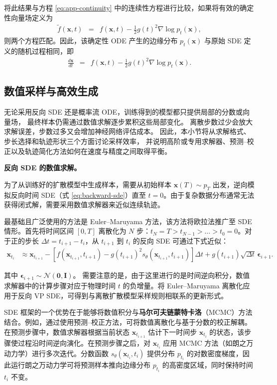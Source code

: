 \documentclass[UTF8,a4paper,zihao=-4,oneside,openany]{ctexbook}
\begin{document}
将此结果与方程 \eqref{eq:app-continuity} 中的连续性方程进行比较，如果将有效的确定性向量场定义为
\begin{eqnarray}
\tilde{f}(\mathbf{x}, t) & = & f(\mathbf{x}, t) - \frac{1}{2} g(t)^2 \nabla \log p_t(\mathbf{x}),
\end{eqnarray}
则两个方程匹配。因此，该确定性 ODE 产生的边缘分布 $p_t(\mathbf{x})$ 与原始 SDE 定义的随机过程相同，即
\begin{eqnarray}
\frac{d\mathbf{x}}{dt} & = & f(\mathbf{x}, t) - \frac{1}{2} g(t)^2 \nabla \log p_t(\mathbf{x}).
\end{eqnarray}

\subsection{数值采样与高效生成}

无论采用反向 SDE 还是概率流 ODE，训练得到的模型都只提供局部的分数或向量场，
最终样本仍需通过数值求解逐步累积这些局部变化。
离散步数过少会放大求解误差，步数过多又会增加神经网络评估成本。
因此，本小节将从求解格式、步长选择和轨迹形状三个方面讨论采样效率，
并说明高阶或专用求解器、预测--校正以及轨迹简化方法如何在速度与精度之间取得平衡。

\textbf{反向 SDE 的数值求解。}

为了从训练好的扩散模型中生成样本，需要从初始样本 $\mathbf{x}(T) \sim p_T$ 出发，逆向模拟反向时间 SDE（式 \eqref{eq:backward-sde}）直至 $t=0$。由于复杂数据分布通常无法获得闭式解，需要采用数值求解器来近似连续轨迹。

最基础且广泛使用的方法是 Euler--Maruyama 方法，该方法将欧拉法推广至 SDE 情形。首先将时间区间 $[0, T]$ 离散化为 $N$ 步：$t_N = T > t_{N-1} > \dots > t_0 = 0$。对于正的步长 $\Delta t = t_{i+1} - t_i$，从 $t_{i+1}$ 到 $t_i$ 的反向 SDE 可通过下式近似：
\begin{align}
\mathbf{x}_{t_i} &\approx \mathbf{x}_{t_{i+1}}
- \left[ f(\mathbf{x}_{t_{i+1}}, t_{i+1})
- g(t_{i+1})^2 s_\theta(\mathbf{x}_{t_{i+1}}, t_{i+1}) \right] \Delta t
+ g(t_{i+1}) \sqrt{\Delta t} \, \boldsymbol{\epsilon}_{i+1}.
\label{eq:reverse-em}
\end{align}

\noindent 其中 $\boldsymbol{\epsilon}_{i+1}\sim\mathcal{N}(\mathbf{0},\mathbf{I})$。
需要注意的是，由于这里进行的是时间逆向积分，数值求解器中的计算步骤对应于物理时间 $t$ 的负增量。将 Euler--Maruyama 离散化应用于反向 VP SDE，可得到与离散扩散模型采样规则相联系的更新形式。

SDE 框架的一个优势在于能够将数值积分与\textbf{马尔可夫链蒙特卡洛}（MCMC）方法结合。例如，通过使用预测--校正方法，可将数值离散化与基于分数的校正解耦。在预测步骤中，数值求解器根据当前状态 $\mathbf{x}_{t_{i+1}}$ 估计下一时间步 $\mathbf{x}_{t_i}$ 的状态，该步骤使过程沿时间逆向演化。在预测步骤之后，对 $\mathbf{x}_{t_i}$ 应用 MCMC 方法（如朗之万动力学）进行多次迭代。分数函数 $s_\theta(\mathbf{x}_{t_i}, t_i)$ 提供分布 $p_{t_i}$ 的对数密度梯度，因此运行朗之万动力学可将预测样本推向边缘分布 $p_{t_i}$ 的高密度区域，同时保持时间 $t_i$ 不变。
\end{document}
